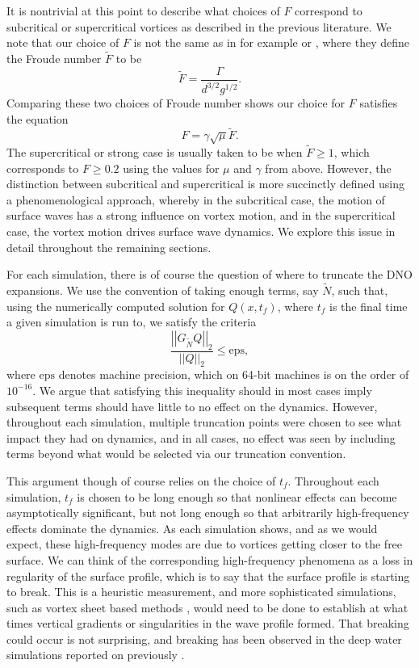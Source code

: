 \documentclass[a4paper,11pt]{article}
\newcommand{\gnorm}[1]{\left|\left| #1\right|\right|}
\begin{document}
It is nontrivial at this point to describe what choices of $F$ correspond to subcritical or supercritical vortices as described in the previous literature.  We note that our choice of $F$ is not the same as in for example \cite{tyvand1} or \cite{telste}, where they define the Froude number $\tilde{F}$ to be  
\[
\tilde{F} = \frac{\Gamma}{d^{3/2}g^{1/2}}.
\] 
Comparing these two choices of Froude number shows our choice for $F$ satisfies the equation 
\[
F = \gamma\sqrt{\mu}\tilde{F}.
\]  
The supercritical or strong case is usually taken to be when $\tilde{F}\geq 1$, which corresponds to $F\geq 0.2$ using the values for $\mu$ and $\gamma$ from above.  However, the distinction between subcritical and supercritical 
is more succinctly defined using a phenomenological approach, whereby in the subcritical case, the motion of surface waves has a strong influence on vortex motion, and in the supercritical case, the vortex motion drives surface wave dynamics.  We explore this issue in detail throughout the remaining sections.  

For each simulation, there is of course the question of where to truncate the DNO expansions.  We use the convention of taking enough terms, say $\tilde{N}$, such that, using the numerically computed solution for $Q(x,t_{f})$, where $t_{f}$ is the final time a given simulation is run to, we satisfy the criteria  
\[
\frac{\gnorm{G_{\tilde{N}} Q}_{2}}{\gnorm{Q}_{2}} \leq \mbox{eps},
\]
where $\mbox{eps}$ denotes machine precision, which on 64-bit machines is on the order of $10^{-16}$.  We argue that satisfying this inequality should in most cases imply subsequent terms should have little to no effect on the dynamics.  However, throughout each simulation, multiple truncation points were chosen to see what impact they had on dynamics, and in all cases, no effect was seen by including terms beyond what would be selected via our truncation convention.

This argument though of course relies on the choice of $t_{f}$.  Throughout each simulation, $t_{f}$ is chosen to be long enough so that nonlinear effects can become asymptotically significant, but not long enough so that arbitrarily high-frequency effects dominate the dynamics.  As each simulation shows, and as we would expect, these high-frequency modes are due to vortices getting closer to the free surface.  We can think of the corresponding high-frequency phenomena as a loss in regularity of the surface profile, which is to say that the surface profile is starting to break.  This is a heuristic measurement, and more sophisticated simulations, such as vortex sheet based methods \cite{telste,baker}, would need to be done to establish at what times vertical gradients or singularities in the wave profile formed.  That breaking could occur is not surprising, and breaking has been observed in the deep water simulations reported on previously \cite{marcus}.
\end{document}
